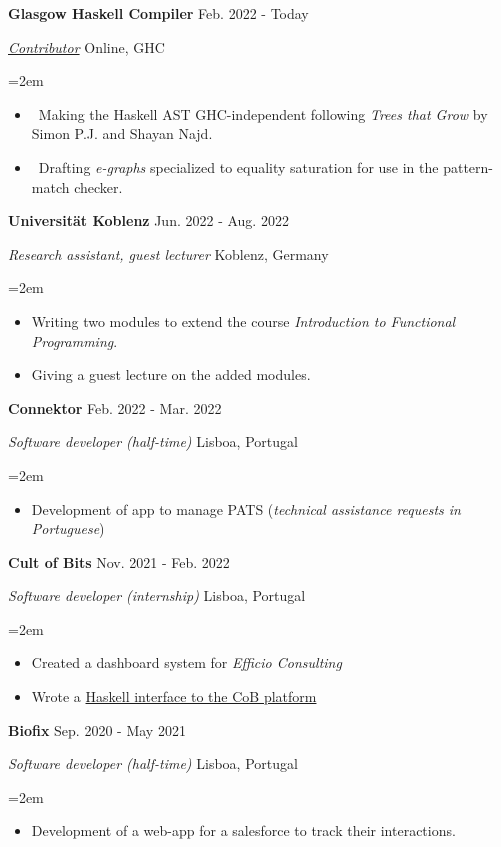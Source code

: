\documentclass{article}
\newcommand{\sientry}[4]{
  \noindent  \textbf{#1}
    \hfill \small #3 \normalsize \par
  \noindent \textit{#2}
    \hfill \small #4 \normalsize \par
}
\newcommand{\entry}[5]{
  \sientry{#1}{#2}{#3}{#4}
     \noindent\hangindent=2em\hangafter=0 \small #5
\normalsize \par
}
\begin{document}
 \entry
    {Glasgow Haskell Compiler}
    {\href{https://gitlab.haskell.org/alt-romes}{Contributor}}
    {Feb. 2022 - Today}
    {Online, GHC}
    {
        \begin{itemize}
            \item {Making the Haskell AST GHC-independent following \emph{Trees
                that Grow} by Simon P.J. and Shayan Najd.}
            \item {Drafting \emph{e-graphs} specialized to equality saturation
                for use in the pattern-match checker.}
        \end{itemize}
    }

  \entry
    {Universität Koblenz}
    {Research assistant, guest lecturer}
    {Jun. 2022 - Aug. 2022}
    {Koblenz, Germany}
    {
      \begin{itemize}
          \item {Writing two modules to extend the course \emph{Introduction to Functional
              Programming}.}
          \item {Giving a guest lecture on the added modules.}
      \end{itemize}
    }

  \entry
    {Connektor}
    {Software developer (half-time)}
    {Feb. 2022 - Mar. 2022}
    {Lisboa, Portugal}
    {
      \begin{itemize}
        \item {Development of app to manage PATS (\emph{technical assistance
            requests in Portuguese})}
      \end{itemize}
    }

  \entry
    {Cult of Bits}
    {Software developer (internship)}
    {Nov. 2021 - Feb. 2022}
    {Lisboa, Portugal}
    {
      \begin{itemize}
        \item {Created a dashboard system for \emph{Efficio Consulting}}
        \item {Wrote a \href{https://github.com/alt-romes/cob-hs}{Haskell interface to the CoB platform}}
      \end{itemize}
    }

  \entry
    {Biofix}
    {Software developer (half-time)}
    {Sep. 2020 - May 2021}
    {Lisboa, Portugal}
    {
      \begin{itemize}
        \item {Development of a web-app for a salesforce to track their
            interactions.}
      \end{itemize}
    }
\end{document}
